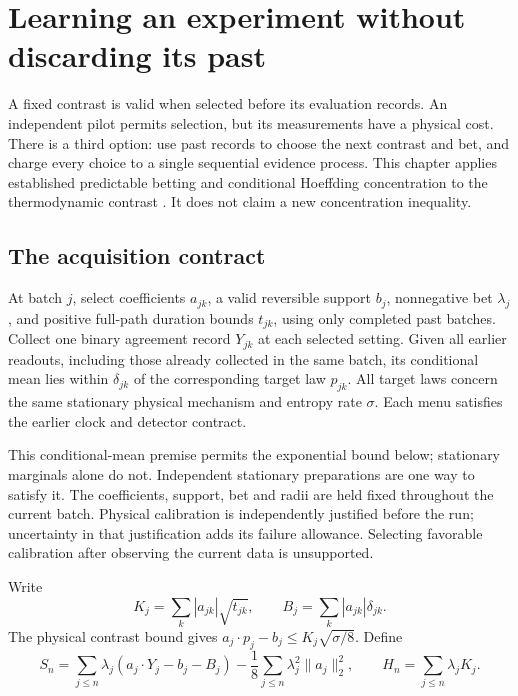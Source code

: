 \chapter{Learning an experiment without discarding its past}
\label{ci:sequential}

A fixed contrast is valid when selected before its evaluation records. An
independent pilot permits selection, but its measurements have a physical cost.
There is a third option: use past records to choose the next contrast and bet,
and charge every choice to a single sequential evidence process. This chapter
applies established predictable betting and conditional Hoeffding concentration
to the thermodynamic contrast \cite{caHoeffding1963,caVille1939,vlHoward2021}.
It does not claim a new concentration inequality.

\section{The acquisition contract}
At batch $j$, select coefficients $a_{jk}$, a valid reversible support $b_j$,
nonnegative bet $\lambda_j$, and positive full-path duration bounds $t_{jk}$,
using only completed past batches. Collect one binary agreement record $Y_{jk}$
at each selected setting. Given all earlier readouts, including those already
collected in the same batch, its conditional mean lies within $\delta_{jk}$ of
the corresponding target law $p_{jk}$. All target laws concern the same
stationary physical mechanism and entropy rate $\sigma$. Each menu satisfies
the earlier clock and detector contract.

This conditional-mean premise permits the exponential bound below; stationary
marginals alone do not. Independent stationary preparations are one way to
satisfy it. The coefficients, support, bet and radii are held fixed throughout
the current batch. Physical calibration is independently justified before the
run; uncertainty in that justification adds its failure allowance. Selecting
favorable calibration after observing the current data is unsupported.

Write
\[
 K_j=\sum_k |a_{jk}|\sqrt{t_{jk}},\qquad
 B_j=\sum_k |a_{jk}|\delta_{jk}.
\]
The physical contrast bound gives
$a_j\cdot p_j-b_j\le K_j\sqrt{\sigma/8}$. Define
\[
 S_n=\sum_{j\le n}\lambda_j(a_j\cdot Y_j-b_j-B_j)
       -\frac18\sum_{j\le n}\lambda_j^2\|a_j\|_2^2,
 \qquad H_n=\sum_{j\le n}\lambda_jK_j.
\]

